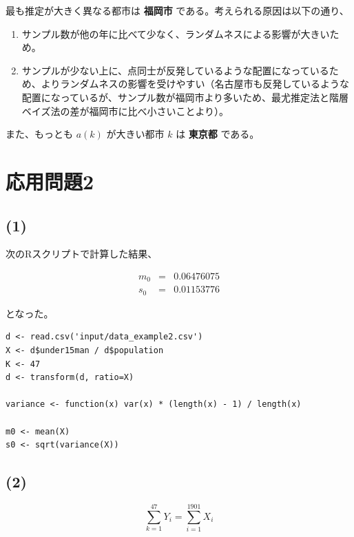 \documentclass[a4j,xelatex,ja=standard,jafont=hiragino-pron, 10pt]{bxjsarticle}
\def\tightlist{\itemsep1pt\parskip0pt\parsep0pt}
\begin{document}
最も推定が大きく異なる都市は \textbf{福岡市}
である。考えられる原因は以下の通り、

\begin{enumerate}
\def\labelenumi{\arabic{enumi}.}
\tightlist
\item
  サンプル数が他の年に比べて少なく、ランダムネスによる影響が大きいため。
\item
  サンプルが少ない上に、点同士が反発しているような配置になっているため、よりランダムネスの影響を受けやすい（名古屋市も反発しているような配置になっているが、サンプル数が福岡市より多いため、最尤推定法と階層ベイズ法の差が福岡市に比べ小さいことより）。
\end{enumerate}

また、もっとも \(a(k)\) が大きい都市 \(k\) は \textbf{東京都} である。

\section*{応用問題2}

\subsection*{(1)}

次のRスクリプトで計算した結果、

\begin{eqnarray}
    m_0 &=& 0.06476075  \\
    s_0 &=& 0.01153776
\end{eqnarray}

となった。

\begin{lstlisting}
d <- read.csv('input/data_example2.csv')
X <- d$under15man / d$population
K <- 47
d <- transform(d, ratio=X)

variance <- function(x) var(x) * (length(x) - 1) / length(x)

m0 <- mean(X)
s0 <- sqrt(variance(X))
\end{lstlisting}

\subsection*{(2)}

\begin{equation}
\sum_{k=1}^{47} Y_i = \sum_{i=1}^{1901} X_i
\end{equation}
\end{document}
